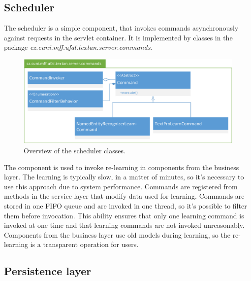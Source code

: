 
\subsection{Scheduler}
The scheduler is a simple component, that invokes commands asynchronously against
requests in the servlet container. It is implemented by classes in the package
\emph{cz.\-cuni.\-mff.\-ufal.\-textan.\-server.\-commands}.

\begin{figure}[!htb]
        \centering
        \includegraphics[width=\textwidth]{Images/Commands}
        \caption{Overview of the scheduler classes.}
        \label{fig:CommandsOverview}
\end{figure}

The component is used to invoke re-learning in components from the business layer.
The learning is typically slow, in a matter of minutes, so it's necessary to use
this approach due to system performance. Commands are registered from methods in
the service layer that modify data used for learning. Commands are stored in one
FIFO queue and are invoked in one thread, so it's possible to filter them before
invocation. This ability ensures that only one learning command is invoked at one
time and that learning commands are not invoked unreasonably. Components from
the business layer use old models during learning, so the re-learning is a transparent
operation for users.

\subsection{Persistence layer}




